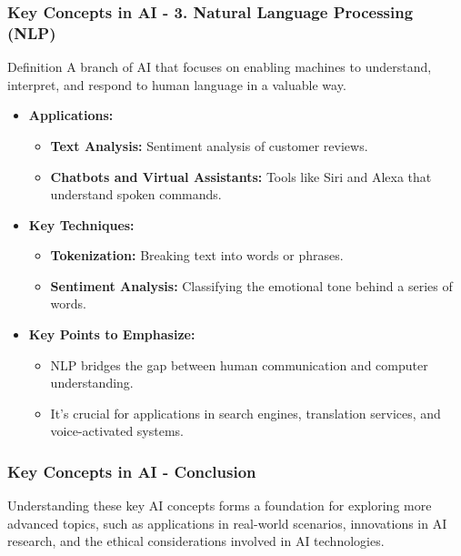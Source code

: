 \documentclass[aspectratio=169]{beamer}
\begin{document}
\begin{frame}[fragile]
    \frametitle{Key Concepts in AI - 3. Natural Language Processing (NLP)}
    \begin{block}{Definition}
        A branch of AI that focuses on enabling machines to understand, interpret, and respond to human language in a valuable way.
    \end{block}

    \begin{itemize}
        \item \textbf{Applications:}
        \begin{itemize}
            \item \textbf{Text Analysis:} Sentiment analysis of customer reviews.
            \item \textbf{Chatbots and Virtual Assistants:} Tools like Siri and Alexa that understand spoken commands.
        \end{itemize}
        
        \item \textbf{Key Techniques:}
        \begin{itemize}
            \item \textbf{Tokenization:} Breaking text into words or phrases.
            \item \textbf{Sentiment Analysis:} Classifying the emotional tone behind a series of words.
        \end{itemize}
        
        \item \textbf{Key Points to Emphasize:}
        \begin{itemize}
            \item NLP bridges the gap between human communication and computer understanding.
            \item It’s crucial for applications in search engines, translation services, and voice-activated systems.
        \end{itemize}
    \end{itemize}
\end{frame}

\begin{frame}[fragile]
    \frametitle{Key Concepts in AI - Conclusion}
    Understanding these key AI concepts forms a foundation for exploring more advanced topics, 
    such as applications in real-world scenarios, innovations in AI research, and the ethical considerations involved in AI technologies.
\end{frame}
\end{document}
